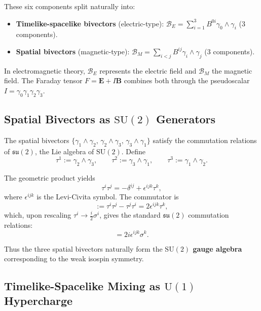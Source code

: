 \documentclass[11pt,a4paper]{article}
\newcommand{\Biv}{\mathcal{B}}
\newcommand{\SU}{\mathrm{SU}}
\newcommand{\U}{\mathrm{U}}
\theoremstyle{definition}
\theoremstyle{plain}
\theoremstyle{remark}
\begin{document}
These six components split naturally into:
\begin{itemize}[leftmargin=*,itemsep=3pt]
  \item \textbf{Timelike-spacelike bivectors} (electric-type): $\Biv_E = \sum_{i=1}^3 B^{0i}\gamma_0\wedge\gamma_i$ (3 components).
  \item \textbf{Spatial bivectors} (magnetic-type): $\Biv_M = \sum_{i<j} B^{ij}\gamma_i\wedge\gamma_j$ (3 components).
\end{itemize}

In electromagnetic theory, $\Biv_E$ represents the electric field and $\Biv_M$ the magnetic field. The Faraday tensor $F = \mathbf{E} + I\mathbf{B}$ combines both through the pseudoscalar $I = \gamma_0\gamma_1\gamma_2\gamma_3$.

\subsection{Spatial Bivectors as $\SU(2)$ Generators}

The spatial bivectors $\{\gamma_1\wedge\gamma_2,\, \gamma_2\wedge\gamma_3,\, \gamma_3\wedge\gamma_1\}$ satisfy the commutation relations of $\mathfrak{su}(2)$, the Lie algebra of $\SU(2)$. Define
\begin{equation}
  \tau^1 := \gamma_2\wedge\gamma_3, \qquad
  \tau^2 := \gamma_3\wedge\gamma_1, \qquad
  \tau^3 := \gamma_1\wedge\gamma_2.
  \label{eq:su2-generators}
\end{equation}

The geometric product yields
\begin{equation}
  \tau^i \tau^j = -\delta^{ij} + \epsilon^{ijk}\tau^k,
\end{equation}
where $\epsilon^{ijk}$ is the Levi-Civita symbol. The commutator is
\begin{equation}
  [\tau^i, \tau^j] := \tau^i \tau^j - \tau^j \tau^i = 2\epsilon^{ijk}\tau^k,
\end{equation}
which, upon rescaling $\tau^i \to \frac{i}{2}\sigma^i$, gives the standard $\mathfrak{su}(2)$ commutation relations:
\begin{equation}
  [\sigma^i, \sigma^j] = 2i\epsilon^{ijk}\sigma^k.
\end{equation}

Thus the three spatial bivectors naturally form the \textbf{$\SU(2)$ gauge algebra} corresponding to the weak isospin symmetry.

\subsection{Timelike-Spacelike Mixing as $\U(1)$ Hypercharge}
\end{document}

